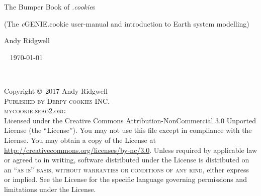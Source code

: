 \documentclass[11pt,fleqn]{book} %
\begin{document}

\begingroup
\thispagestyle{empty}
\centering
\vspace*{7.5 cm}
\par\normalfont\fontsize{30}{30}\sffamily\selectfont
\textcolor[rgb]{1,1,0}{The Bumper Book of \textit{.cookie}s}\par %
\vspace*{0.5cm}
\par\normalfont\fontsize{21}{21}\sffamily\selectfont
\textcolor[rgb]{0,0,1}{(The \textit{c}GENIE.cookie user-manual and introduction to Earth system modelling)}\par %
\vspace*{1cm}
{\Huge \textcolor[rgb]{1,1,1}{Andy Ridgwell}}\par %
\endgroup

~\vfill
\textcolor[rgb]{1,0,0}{\today}


\newpage
~\vfill
\thispagestyle{empty}

\noindent Copyright \copyright\ 2017 Andy Ridgwell\\ %

\noindent \textsc{Published by Derpy-cookies INC.}\\ %

\noindent \textsc{mycookie.seao2.org}\\ %

\noindent Licensed under the Creative Commons Attribution-NonCommercial 3.0 Unported License (the ``License''). You may not use this file except in compliance with the License. You may obtain a copy of the License at \url{http://creativecommons.org/licenses/by-nc/3.0}. Unless required by applicable law or agreed to in writing, software distributed under the License is distributed on an \textsc{``as is'' basis, without warranties or conditions of any kind}, either express or implied. See the License for the specific language governing permissions and limitations under the License.\\ %
\end{document}
